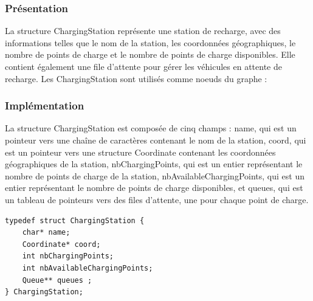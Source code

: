 \documentclass[french,a4paper]{article}
\begin{document}
    \subsubsection{Présentation}
    La structure ChargingStation représente une station de recharge, avec des informations telles que le nom de la station, les coordonnées géographiques, le nombre de points de charge et le nombre de points de charge disponibles. Elle contient également une file d'attente pour gérer les véhicules en attente de recharge. Les ChargingStation sont utilisés comme noeuds du graphe :

    \begin{center}
    \end{center}

    \subsubsection{Implémentation}
    La structure ChargingStation est composée de cinq champs : name, qui est un pointeur vers une chaîne de caractères contenant le nom de la station, coord, qui est un pointeur vers une structure Coordinate contenant les coordonnées géographiques de la station, nbChargingPoints, qui est un entier représentant le nombre de points de charge de la station, nbAvailableChargingPoints, qui est un entier représentant le nombre de points de charge disponibles, et queues, qui est un tableau de pointeurs vers des files d'attente, une pour chaque point de charge. \\

    \begin{center}
        \begin{lstlisting}[caption=Structure ChargingStation]
typedef struct ChargingStation {
    char* name;
    Coordinate* coord;
    int nbChargingPoints;
    int nbAvailableChargingPoints;
    Queue** queues ;
} ChargingStation;
        \end{lstlisting}
    \end{center}
\end{document}
